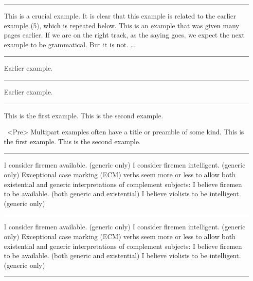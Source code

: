 \filbreak\hrule\medskip

\begingroup
\ex This is a crucial example.\xe
It is clear that this example is related to the earlier
example (5), which is repeated below.
\ex[exno=5]
This is an example that was given many pages earlier.\xe
If we are on the right track, as the saying goes,
we expect the next example to be grammatical.  But it is not.
\ex * \dots\xe
\endgroup
\bigskip

\filbreak\hrule\medskip

\begingroup
\ex[exno=$\Delta$] Earlier example.\xe
\endgroup
\bigskip

\filbreak\hrule\medskip

\begingroup
\ex[exno={[14, repeated]},exnoformat=X] Earlier example.\xe
\endgroup
\bigskip

\filbreak\hrule\medskip

\begingroup
\pex
\a This is the first example.
\a This is the second example.
\xe

\pex~<Pre> Multipart examples often have a title or preamble of some
kind.
\a This is the first example.
\a This is the second example.
\xe
\endgroup
\bigskip

\filbreak\hrule\medskip

\begingroup
\keepexcntlocal {}
\pex
\a I consider firemen available. (generic only)
\a I consider firemen intelligent. (generic only)
\xe
Exceptional case marking (ECM) verbs seem more or less to allow both
existential and generic interpretations of complement subjects:
\pex
\a I believe firemen to be available. (both generic and existential)
\a I believe violists to be intelligent. (generic only)
\xe
\endgroup
\bigskip

\filbreak\hrule\medskip

\begingroup
\keepexcntlocal {}
\pex[sampleexno=(10)]
\a I consider firemen available. (generic only)
\a I consider firemen intelligent. (generic only)
\xe
Exceptional case marking (ECM) verbs seem more or less to allow both
existential and generic interpretations of complement subjects:
\pex
\a I believe firemen to be available. (both generic and existential)
\a I believe violists to be intelligent. (generic only)
\xe
\endgroup
\bigskip

\filbreak\hrule\medskip

\begingroup
{}
\endgroup
\bigskip

